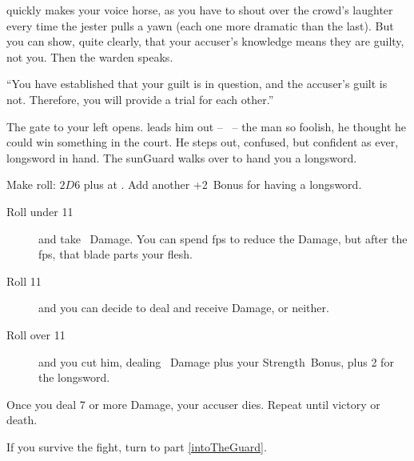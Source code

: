 quickly makes your voice horse, as you have to shout over the crowd's laughter every time the jester pulls a yawn (each one more dramatic than the last).
But you can show, quite clearly, that your accuser's knowledge means they are guilty, not you.
Then the \gls{warden} speaks.

``You have established that your guilt is in question, and the accuser's guilt is not.
Therefore, you will provide a trial for each other.''

The gate to your left opens.
 leads him out -- \composeHumanName\ -- the man so foolish, he thought he could win something in the \gls{court}.
He steps out, confused, but confident as ever, longsword in hand.
The \gls{sunGuard} walks over to hand you a longsword.

Make  roll: $2D6$ plus  at \tn[11].
Add another +2~Bonus for having a longsword.

\begin{description}
  \item[Roll under 11]
  and take ~Damage.
  You can spend \glspl{fp} to reduce the Damage, but after the \glspl{fp}, that blade parts your flesh.
  \item[Roll 11]
  and you can decide to deal and receive Damage, or neither.
  \item[Roll over 11]
  and you cut him, dealing ~Damage plus your Strength~Bonus, plus 2 for the longsword.
\end{description}

Once you deal 7 or more Damage, your accuser dies.
Repeat until victory or death.

If you survive the fight, turn to part \vref{intoTheGuard}.

